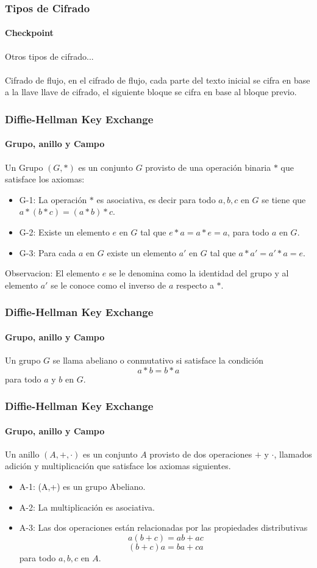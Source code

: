 \documentclass[spanish, mexico]{beamer}
\begin{document}
	\begin{frame}
		\frametitle{Tipos de Cifrado}
		\framesubtitle{Checkpoint}
		 Otros tipos de cifrado...\\~\\
		 Cifrado de flujo, en el cifrado de flujo, cada parte del texto inicial se cifra en base a la llave llave de cifrado, el siguiente bloque se cifra en base al bloque previo.
	\end{frame}
	
	\begin{frame}
		\frametitle{Diffie-Hellman Key Exchange}
		\framesubtitle{Grupo, anillo y Campo}
		\begin{definition} [Grupo]
		    Un Grupo $(G, *)$ es un conjunto $G$ provisto de una operación binaria $*$ que satisface los axiomas:
		    \begin{itemize}
		        \item G-1: La operación $*$ es asociativa, es decir para todo $a,b,c$ en $G$ se tiene que $a*(b*c) = (a*b)*c$.
		        \item G-2: Existe un elemento $e$ en $G$ tal que $e*a = a*e = a$, para todo $a$ en $G$.
		        \item G-3: Para cada $a$ en $G$ existe un elemento $a'$ en $G$ tal que $a*a' = a'*a = e$.
		    \end{itemize}
		\end{definition}
		Observacion: El elemento $e$ se le denomina como la identidad del grupo y al elemento $a'$ se le conoce como el inverso de $a$ respecto a $*$.
	\end{frame}
	
	\begin{frame}
	    \frametitle{Diffie-Hellman Key Exchange}
		\framesubtitle{Grupo, anillo y Campo}
	    \begin{definition} 
		    Un grupo $G$ se llama abeliano o conmutativo si satisface la condición
		    $$a*b = b*a$$
		    para todo $a$ y $b$ en $G$.
		\end{definition}
	\end{frame}
	
	\begin{frame}
	    \frametitle{Diffie-Hellman Key Exchange}
		\framesubtitle{Grupo, anillo y Campo}
	    \begin{definition} [Anillo]
		    Un anillo $(A,+,\cdot)$ es un conjunto $A$ provisto de dos operaciones $+$ y $\cdot$, llamados adición y multiplicación que satisface los axiomas siguientes.
		    \begin{itemize}
		        \item A-1: (A,+) es un grupo Abeliano.
		        \item A-2: La multiplicación es asociativa.
		        \item A-3: Las dos operaciones están relacionadas por las propiedades distributivas
		        $$a(b+c) = ab + ac$$
		        $$(b + c)a = ba + ca$$
		        para todo $a,b,c$ en $A$.
		    \end{itemize}
		\end{definition}
	\end{frame}
	
\end{document}

